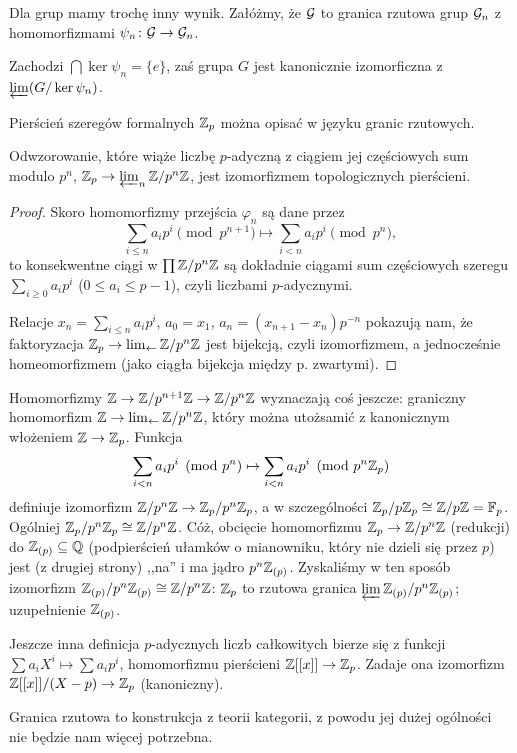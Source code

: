 Dla grup mamy trochę inny wynik.
Załóżmy, że $\mathcal G$ to granica rzutowa grup $\mathcal G_n$ z homomorfizmami $\psi_n \colon \mathcal G \to \mathcal G_n$.

\begin{fakt}
	Zachodzi $\bigcap \ker \psi_n = \{e\}$, zaś grupa $G$ jest kanonicznie izomorficzna z $\varprojlim (G / \ker \psi_n)$.
\end{fakt}

Pierścień szeregów formalnych $\mathbb Z_p$ można opisać w języku granic rzutowych.

\begin{fakt}
	Odwzorowanie, które wiąże liczbę $p$-adyczną z ciągiem jej częściowych sum modulo ${p^n}$, $\mathbb Z_p \to \varprojlim_n \mathbb Z/p^n\mathbb Z$, jest izomorfizmem topologicznych pierścieni.
\end{fakt}

\begin{proof}
	Skoro homomorfizmy przejścia $\varphi_n$ są dane przez
	\[
		\sum_{i \le n} a_ip^i \pmod {p^{n+1}} \mapsto \sum_{i<n} a_ip^i \pmod {p^n},
	\]
	to konsekwentne ciągi w $\prod \mathbb Z/p^n\mathbb Z$ są dokładnie ciągami sum częściowych szeregu $\sum_{i \ge 0} a_i p^i$ ($0 \le a_i\le p-1$), czyli liczbami $p$-adycznymi.

	Relacje $x_n = \sum_{i \le n} a_ip^i$, $a_0 = x_1$, $a_n = (x_{n+1} - x_n)p^{-n}$ pokazują nam, że faktoryzacja $\mathbb Z_p \to \lim_{\leftarrow} \mathbb Z/p^n\mathbb Z$ jest bijekcją, czyli izomorfizmem, a jednocześnie homeomorfizmem (jako ciągła bijekcja między p. zwartymi).
\end{proof}

Homomorfizmy $\mathbb Z \to \mathbb Z/p^{n+1} \mathbb Z \to \mathbb Z/p^n\mathbb Z$ wyznaczają coś jeszcze: graniczny homomorfizm $\mathbb Z \to \lim_{\leftarrow} \mathbb Z/p^n\mathbb Z$, który można utożsamić z kanonicznym włożeniem $\mathbb Z \to \mathbb Z_p$.
Funkcja
\[
	\sum_{i < n} a_ip^i \pmod {p^n} \mapsto \sum_{i<n} a_ip^i \pmod {p^n \mathbb Z_p}
\]
definiuje izomorfizm $\mathbb Z/p^n\mathbb Z \to \mathbb Z_p/p^n\mathbb Z_p$, a w szczególności $\mathbb Z_p / p\mathbb Z_p \cong \mathbb Z/p\mathbb Z = \mathbb F_p$.
Ogólniej $\mathbb Z_p/p^n \mathbb Z_p \cong \mathbb Z/p^n\mathbb Z$.
Cóż, obcięcie homomorfizmu $\mathbb Z_p \to \mathbb Z/p^n\mathbb Z$ (redukcji) do $\mathbb Z_{(p)} \subseteq \mathbb Q$ (podpierścień ułamków o mianowniku, który nie dzieli się przez $p$) jest (z drugiej strony) ,,na'' i ma jądro $p^n\mathbb Z_{(p)}$.
Zyskaliśmy w ten sposób izomorfizm $\mathbb Z_{(p)} / p^n \mathbb Z_{(p)} \cong \mathbb Z/p^n\mathbb Z$: $\mathbb Z_p$ to rzutowa granica $\varprojlim \mathbb Z_{(p)} / p^n\mathbb Z_{(p)}$; uzupełnienie $\mathbb Z_{(p)}$.

Jeszcze inna definicja $p$-adycznych liczb całkowitych bierze się z funkcji $\sum a_i X^i \mapsto \sum a_i p^i$, homomorfizmu pierścieni $\mathbb Z[[x]] \to \mathbb Z_p$.
Zadaje ona izomorfizm $\mathbb Z[[x]] / (X-p) \to \mathbb Z_p$ (kanoniczny).

Granica rzutowa to konstrukcja z teorii kategorii, z powodu jej dużej ogólności nie będzie nam więcej potrzebna.
